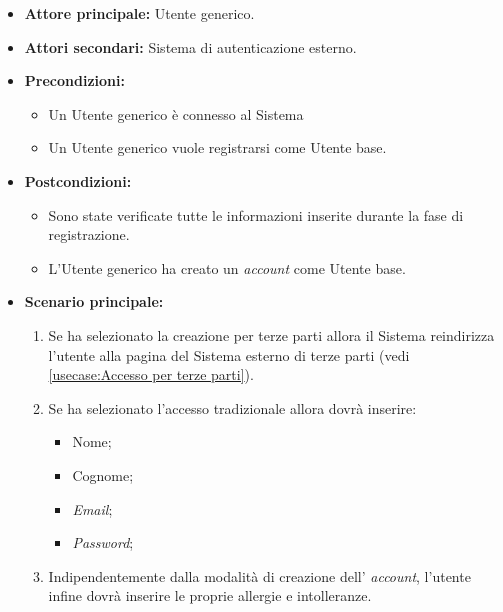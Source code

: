 \label{usecase:Registrazione Utente base}
\begin{itemize}

	\item \textbf{Attore principale:} Utente generico.
	\item \textbf{Attori secondari:} Sistema di autenticazione esterno.

	\item \textbf{Precondizioni:} 
	\begin{itemize}
        \item  Un Utente generico è connesso al Sistema
        \item  Un Utente generico vuole registrarsi come Utente base.
    \end{itemize}
    

	\item \textbf{Postcondizioni:} 
    \begin{itemize}
        \item  Sono state verificate tutte le informazioni inserite durante la fase di registrazione.
        \item  L'Utente generico ha creato un \textit{account} come Utente base.
    \end{itemize}

	\item \textbf{Scenario principale:}
	\begin{enumerate}

            \item Se ha selezionato la creazione per terze parti allora il Sistema reindirizza l'utente alla pagina del Sistema esterno di terze parti (vedi \autoref{usecase:Accesso per terze parti}).
            \item Se ha selezionato l'accesso tradizionale allora dovrà inserire:
            \begin{itemize}
                \item Nome;
                \item Cognome;
                \item \textit{Email};
                \item \textit{Password};
            \end{itemize}
            \item Indipendentemente dalla modalità di creazione dell' \textit{account}, l'utente infine dovrà inserire le proprie allergie e intolleranze.
            
	\end{enumerate}
	
\end{itemize}

